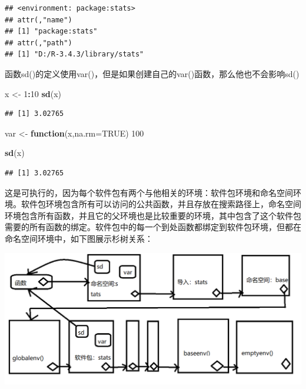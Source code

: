 \documentclass[]{book}
\newenvironment{Shaded}{\begin{snugshade}}{\end{snugshade}}
\newcommand{\KeywordTok}[1]{\textcolor[rgb]{0.13,0.29,0.53}{\textbf{#1}}}
\newcommand{\DataTypeTok}[1]{\textcolor[rgb]{0.13,0.29,0.53}{#1}}
\newcommand{\DecValTok}[1]{\textcolor[rgb]{0.00,0.00,0.81}{#1}}
\newcommand{\StringTok}[1]{\textcolor[rgb]{0.31,0.60,0.02}{#1}}
\newcommand{\OtherTok}[1]{\textcolor[rgb]{0.56,0.35,0.01}{#1}}
\newcommand{\ControlFlowTok}[1]{\textcolor[rgb]{0.13,0.29,0.53}{\textbf{#1}}}
\newcommand{\OperatorTok}[1]{\textcolor[rgb]{0.81,0.36,0.00}{\textbf{#1}}}
\newcommand{\NormalTok}[1]{#1}
\begin{document}
\begin{verbatim}
## <environment: package:stats>
## attr(,"name")
## [1] "package:stats"
## attr(,"path")
## [1] "D:/R-3.4.3/library/stats"
\end{verbatim}

函数sd()的定义使用var()，但是如果创建自己的var()函数，那么他也不会影响sd()

\begin{Shaded}
\begin{Highlighting}[]
\NormalTok{x <-}\StringTok{ }\DecValTok{1}\OperatorTok{:}\DecValTok{10}
\KeywordTok{sd}\NormalTok{(x)}
\end{Highlighting}
\end{Shaded}

\begin{verbatim}
## [1] 3.02765
\end{verbatim}

\begin{Shaded}
\begin{Highlighting}[]
\NormalTok{var <-}\StringTok{ }\ControlFlowTok{function}\NormalTok{(x,}\DataTypeTok{na.rm=}\OtherTok{TRUE}\NormalTok{) }\DecValTok{100}

\KeywordTok{sd}\NormalTok{(x)}
\end{Highlighting}
\end{Shaded}

\begin{verbatim}
## [1] 3.02765
\end{verbatim}

这是可执行的，因为每个软件包有两个与他相关的环境：软件包环境和命名空间环境。软件包环境包含所有可以访问的公共函数，并且存放在搜索路径上，命名空间环境包含所有函数，并且它的父环境也是比较重要的环境，其中包含了这个软件包需要的所有函数的绑定。软件包中的每一个到处函数都绑定到软件包环境，但都在命名空间环境中，如下图展示杉树关系：

\begin{center}\includegraphics{img/ch7-9} \end{center}
\end{document}

